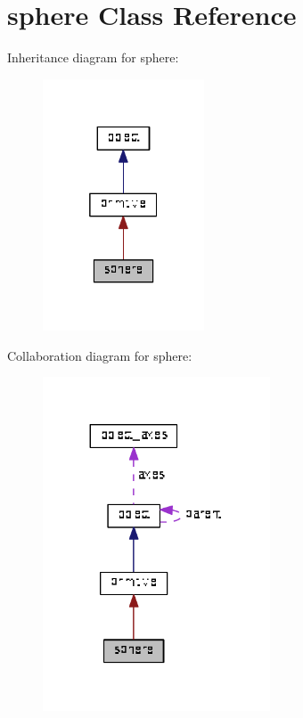 \hypertarget{classsphere}{}\section{sphere Class Reference}
\label{classsphere}


Inheritance diagram for sphere\+:\nopagebreak
\begin{figure}[H]
\begin{center}
\leavevmode
\includegraphics[width=136pt]{classsphere__inherit__graph}
\end{center}
\end{figure}


Collaboration diagram for sphere\+:\nopagebreak
\begin{figure}[H]
\begin{center}
\leavevmode
\includegraphics[width=191pt]{classsphere__coll__graph}
\end{center}
\end{figure}
